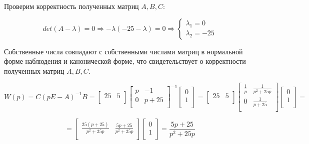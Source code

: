 \documentclass[14pt,a4paper,report]{report}
\begin{document}
Проверим корректность полученных матриц $A, B, C$:

\begin{equation*}
\text{$det(A-\lambda)=0$}
\Longrightarrow
\text{$-\lambda(-25-\lambda)=0$}
\Longrightarrow
\begin{cases}
	\text{$\lambda_1=0$} \\
	\text{$\lambda_2=-25$}
\end{cases}
\end{equation*}

Собственные числа совпадают с собственными числами матриц в нормальной форме наблюдения и канонической форме, что свидетельствует о корректности полученных матриц  $A, B, C$.

\begin{equation*}
\text{$W(p)=C(pE-A)^{-1}B=
\begin{bmatrix}
25 & 5 \\
\end{bmatrix}
\begin{bmatrix}
p & -1 \\
0 & p+25\\
\end{bmatrix}^{-1}
\begin{bmatrix}
0 \\
1 \\
\end{bmatrix}=
\begin{bmatrix}
25 & 5 \\
\end{bmatrix}
\begin{bmatrix}
\frac{1}{p} & \frac{1}{p^2+25p} \\
0 & \frac{1}{p+25}\\
\end{bmatrix}
\begin{bmatrix}
0 \\
1 \\
\end{bmatrix}=
$}
\end{equation*}

\begin{equation*}
\text{$=\begin{bmatrix}
	\frac{25(p+25)}{p^2+25p} & \frac{5p+25}{p^2+25p} \\
	\end{bmatrix}\begin{bmatrix}
	0 \\
	1 \\
	\end{bmatrix}=\frac{5p+25}{p^2+25p}
	$}
\end{equation*}
\end{document}
